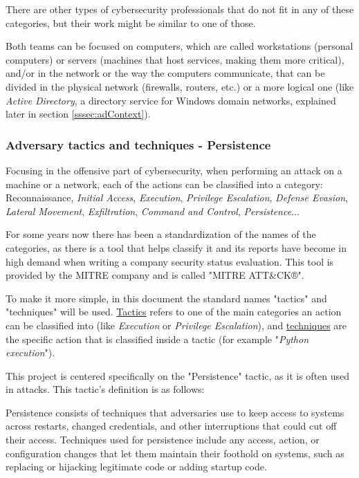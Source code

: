 There are other types of cybersecurity professionals that do not fit in any of these categories, but their work might be similar to one of those.

Both teams can be focused on computers, which are called workstations (personal computers) or servers (machines that host services, making them more critical), and/or in the network or the way the computers communicate, that can be divided in the physical network (firewalls, routers, etc.) or a more logical one (like \textit{Active Directory}, a directory service for Windows domain networks, explained later in section \ref{sssec:adContext}).

\subsubsection{Adversary tactics and techniques - Persistence}
\label{sssec:persistence}

Focusing in the offensive part of cybersecurity, when performing an attack on a machine or a network, each of the actions can be classified into a category: Reconnaissance, \textit{Initial Access}, \textit{Execution}, \textit{Privilege Escalation}, \textit{Defense Evasion}, \textit{Lateral Movement}, \textit{Exfiltration}, \textit{Command and Control}, \textit{Persistence}...

For some years now there has been a standardization of the names of the categories, as there is a tool that helps classify it and its reports have become in high demand when writing a company security status evaluation. This tool is provided by the MITRE company and is called "MITRE ATT\&CK®"\cite{MitreWeb}. 

To make it more simple, in this document the standard names "tactics" and "techniques" will be used. \underline{Tactics} refers to one of the main categories an action can be classified into (like \textit{Execution} or \textit{Privilege Escalation}), and \underline{techniques} are the specific action that is classified inside a tactic (for example "\textit{Python execution}"). 

\pagebreak
This project is centered specifically on the "Persistence" tactic, as it is often used in attacks. This tactic's definition is as follows\cite{Mitre}:

\begin{displayquote}
Persistence consists of techniques that adversaries use to keep access to systems across restarts, changed credentials, and other interruptions that could cut off their access. Techniques used for persistence include any access, action, or configuration changes that let them maintain their foothold on systems, such as replacing or hijacking legitimate code or adding startup code.
\end{displayquote}

